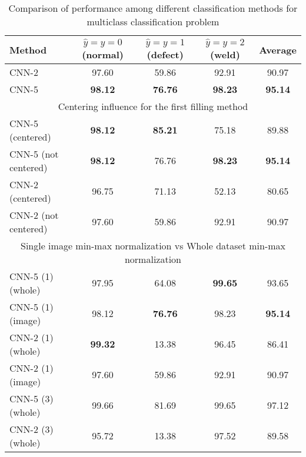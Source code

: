 \begin{table}[!htb]
	\caption{\label{tab:comp2}Comparison of performance among different classification methods for multiclass classification problem}
	\begin{center}
		\small
		\begin{tabular}{| l | c | c | c | c |}
			\hline
			Method & $\hat{y}=y=0$ (normal) & $\hat{y}=y=1$ (defect) & $\hat{y}=y=2$ (weld) & Average \\
			\hline
			CNN-2 & 97.60 & 59.86 & 92.91 & 90.97 \\
			CNN-5 & \textbf{98.12} & \textbf{76.76} & \textbf{98.23} & \textbf{95.14} \\
			\hline
			\multicolumn{5}{|c|}{Centering influence for the first filling method}  \\
			\hline
			CNN-5 (centered) & \textbf{98.12} & \textbf{85.21} & 75.18 & 89.88 \\
			CNN-5 (not centered) &  \textbf{98.12} & 76.76 & \textbf{98.23} & \textbf{95.14} \\
			CNN-2 (centered) & 96.75 & 71.13 & 52.13 & 80.65 \\
			CNN-2 (not centered) & 97.60 & 59.86 & 92.91 & 90.97 \\
			\hline
			\multicolumn{5}{|c|}{Single image min-max normalization vs Whole dataset min-max normalization}  \\
			\hline
			CNN-5 (1) (whole) & 97.95 & 64.08 & \textbf{99.65} & 93.65 \\
			CNN-5 (1) (image) &  98.12 & \textbf{76.76} & 98.23 & \textbf{95.14} \\
			CNN-2 (1) (whole) & \textbf{99.32} & 13.38 & 96.45 & 86.41 \\
			CNN-2 (1) (image) & 97.60 & 59.86 & 92.91 & 90.97 \\
			CNN-5 (3) (whole) & 99.66 & 81.69 & 99.65 & 97.12 \\
			CNN-2 (3) (whole) & 95.72 & 13.38 & 97.52 & 89.58 \\
			\hline
		\end{tabular}
	\end{center}
\end{table}
